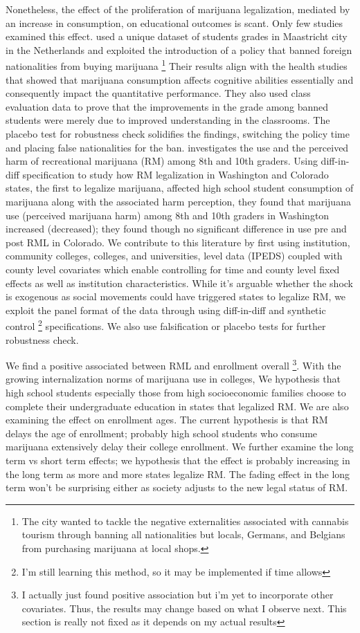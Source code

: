 \documentclass[12pt]{article}%
\begin{document}
Nonetheless, the effect of the proliferation of marijuana  legalization, mediated by an increase in consumption, on educational outcomes  is scant. Only few studies examined this effect. \citet{marie2017high} used a unique dataset of students grades in Maastricht city in the Netherlands and exploited the introduction of a policy that banned foreign nationalities from buying marijuana 
\footnote{The city wanted to tackle the negative externalities associated with cannabis tourism through banning all nationalities but locals, Germans, and Belgians from purchasing marijuana at local shops.} 
Their results align with the health studies that showed that marijuana consumption affects cognitive abilities essentially and consequently impact the quantitative
performance. They also used class evaluation data to prove that the improvements in the grade among banned students were merely due to improved understanding in the classrooms. The
placebo test for robustness check solidifies the findings, switching the policy time and placing false nationalities for the ban. 
\cite{cerda2017association}  investigates the use and the perceived harm of recreational marijuana (RM) among 8th and 10th graders. Using diff-in-diff specification to study how RM legalization in Washington and Colorado states, the first to legalize marijuana, affected high school student consumption of marijuana along with the associated harm perception, they found that marijuana use (perceived marijuana harm) among 8th and 10th graders in Washington increased (decreased); they found though no significant difference in use pre and post RML in Colorado. We contribute to this literature by first using institution, community colleges, colleges, and universities, level data (IPEDS) coupled with county level covariates which enable controlling for time and county level fixed effects as well as institution characteristics. While it's arguable whether the shock is exogenous as social movements could have triggered states to legalize RM, we exploit the panel format of the data through using diff-in-diff and synthetic control \footnote{I'm still learning this method, so it may be implemented if time allows} specifications. We also use falsification or placebo tests for further robustness check.

We find  a positive associated between RML and enrollment overall \footnote{I actually just found positive association but i'm yet to incorporate other covariates. Thus, the results may change based on what I observe next. This section is really not fixed as it depends on my actual results}. With the growing internalization norms of marijuana use in colleges, We hypothesis that high school students especially those from high socioeconomic families choose to complete their undergraduate education in states that legalized RM. We are also examining the effect on enrollment ages. The current hypothesis is that RM delays the age of enrollment; probably high school students who consume marijuana extensively delay their college enrollment. We further examine the long term vs short term effects; we hypothesis that the effect is probably increasing in the long term as more and more states legalize RM. The fading effect in the long term won't be surprising either as society adjusts to the new legal status of RM.
\end{document}
